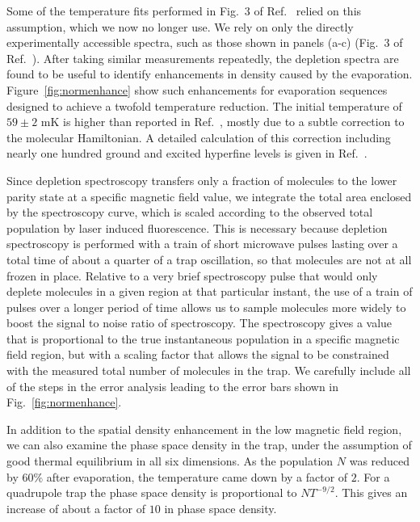 \documentclass[%
 reprint,
 amsmath,amssymb,
 aps,
prl,
]{revtex4-1}
\begin{document}
Some of the temperature fits performed in Fig.~3 of Ref.~\cite{Stuhl2012evap} relied on this assumption, which we now no longer use. We rely on only the directly experimentally accessible spectra, such as those shown in panels (a-c) (Fig.~3 of Ref.~\cite{Stuhl2012evap}). After taking similar measurements repeatedly, the depletion spectra are found to be useful to identify enhancements in density caused by the evaporation. Figure~\ref{fig:normenhance} show such enhancements for evaporation sequences designed to achieve a twofold temperature reduction. The initial temperature of $59\pm2\text{ mK}$ is higher than reported in Ref.~\cite{Stuhl2012evap}, mostly due to a subtle correction to the molecular Hamiltonian.  A detailed calculation of this correction including nearly one hundred ground and excited hyperfine levels is given in Ref.~\cite{Maeda2015}.

Since depletion spectroscopy transfers only a fraction of molecules to the lower parity state at a specific magnetic field value, we integrate the total area enclosed by the spectroscopy curve, which is scaled according to the observed total population by laser induced fluorescence.  This is necessary because depletion spectroscopy is performed with a train of short microwave pulses lasting over a total time of about a quarter of a trap oscillation, so that molecules are not at all frozen in place.  Relative to a very brief spectroscopy pulse that would only deplete molecules in a given region at that particular instant, the use of a train of pulses over a longer period of time allows us to sample molecules more widely to boost the signal to noise ratio of spectroscopy.  The spectroscopy gives a value that is proportional to the true instantaneous population in a specific magnetic field region, but with a scaling factor that allows the signal to be constrained with the measured total number of molecules in the trap.  We carefully include all of the steps in the error analysis leading to the error bars shown in Fig.~\ref{fig:normenhance}.  

In addition to the spatial density enhancement in the low magnetic field region, we can also examine the phase space density in the trap, under the assumption of good thermal equilibrium in all six dimensions. As the population $N$ was reduced by $60\%$ after evaporation, the temperature came down by a factor of $2$. For a quadrupole trap the phase space density is proportional to $N T^{-9/2}$. This gives an increase of about a factor of $10$ in phase space density. 
\end{document}
